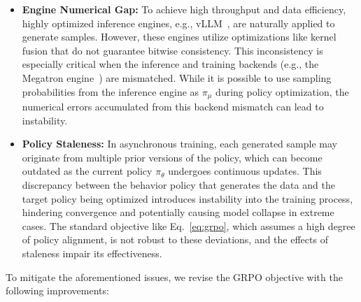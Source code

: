 \begin{itemize}
    \item \textbf{Engine Numerical Gap:} To achieve high throughput and data efficiency, highly optimized inference engines, e.g., vLLM~\citep{vllm}, are naturally applied to generate samples. However, these engines utilize optimizations like kernel fusion that do not guarantee bitwise consistency. This inconsistency is especially critical when the inference and training backends (e.g., the Megatron engine~\citep{shoeybi2019megatron}) are mismatched. While it is possible to use sampling probabilities from the inference engine as $\pi_{\mu}$ during policy optimization, the numerical errors accumulated from this backend mismatch can lead to instability.
    \item \textbf{Policy Staleness:} In asynchronous training, each generated sample may originate from multiple prior versions of the policy, which can become outdated as the current policy $\pi_\theta$ undergoes continuous updates. This discrepancy between the behavior policy that generates the data and the target policy being optimized introduces instability into the training process, hindering convergence and potentially causing model collapse in extreme cases. The standard objective like Eq.~\ref{eq:grpo}, which assumes a high degree of policy alignment, is not robust to these deviations, and the effects of staleness impair its effectiveness.
\end{itemize}
To mitigate the aforementioned issues, we revise the GRPO objective with the following improvements:
